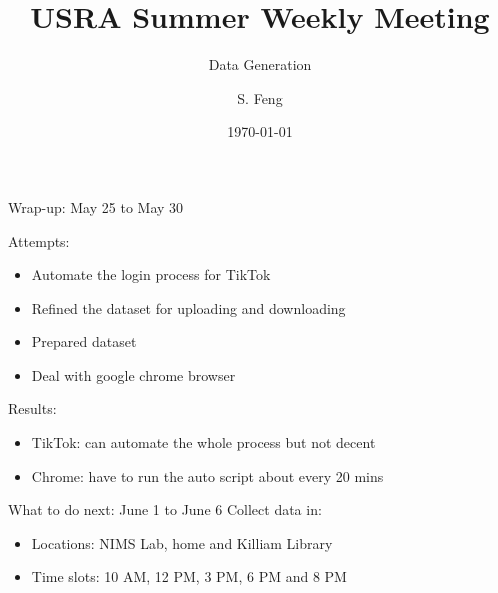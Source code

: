 \documentclass{beamer}
\title[Weekly Meeting]{
    USRA Summer Weekly Meeting
}
\subtitle[]{Data Generation}
\author[Shuo Feng]{S. Feng}
\institute[NIMS Lab]{
  NIMS Lab\\
  USRA Summer 2023}
\date{\today}
\begin{document}
\frame{\titlepage}

\begin{frame}{Wrap-up: May 25 to May 30}

  Attempts:
  \begin{itemize}
    \item Automate the login process for TikTok
    \item Refined the dataset for uploading and downloading
    \item Prepared dataset
    \item Deal with google chrome browser
  \end{itemize}

  Results:
  \begin{itemize}
    \item TikTok: can automate the whole process but not decent
    \item Chrome: have to run the auto script about every 20 mins
  \end{itemize}

\end{frame}

\begin{frame}{What to do next: June 1 to June 6}
  Collect data in:
  \begin{itemize}
    \item Locations: NIMS Lab, home and Killiam Library
    \item Time slots: 10 AM, 12 PM, 3 PM, 6 PM and 8 PM
  \end{itemize}
\end{frame}
\end{document}
